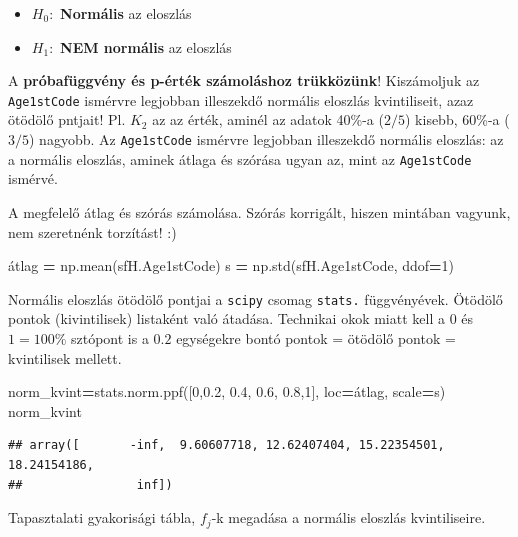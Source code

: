 \documentclass[
]{book}
\newenvironment{Shaded}{\begin{snugshade}}{\end{snugshade}}
\newcommand{\DecValTok}[1]{\textcolor[rgb]{0.00,0.00,0.81}{#1}}
\newcommand{\FloatTok}[1]{\textcolor[rgb]{0.00,0.00,0.81}{#1}}
\newcommand{\NormalTok}[1]{#1}
\newcommand{\OperatorTok}[1]{\textcolor[rgb]{0.81,0.36,0.00}{\textbf{#1}}}
\providecommand{\tightlist}{%
  \setlength{\itemsep}{0pt}\setlength{\parskip}{0pt}}
\begin{document}
\begin{itemize}
\tightlist
\item
  \(H_0:\) \textbf{Normális} az eloszlás
\item
  \(H_1:\) \textbf{NEM normális} az eloszlás
\end{itemize}

A \textbf{próbafüggvény és p-érték számoláshoz trükközünk}! Kiszámoljuk az \texttt{Age1stCode} ismérvre legjobban illeszekdő normális eloszlás kvintiliseit, azaz ötödölő pntjait! Pl. \(K_2\) az az érték, aminél az adatok 40\%-a (\(2/5\)) kisebb, 60\%-a (\(3/5\)) nagyobb.
Az \texttt{Age1stCode} ismérvre legjobban illeszekdő normális eloszlás: az a normális eloszlás, aminek átlaga és szórása ugyan az, mint az \texttt{Age1stCode} ismérvé.

A megfelelő átlag és szórás számolása. Szórás korrigált, hiszen mintában vagyunk, nem szeretnénk torzítást! :)

\begin{Shaded}
\begin{Highlighting}[]
\NormalTok{átlag }\OperatorTok{=}\NormalTok{ np.mean(sfH.Age1stCode)}
\NormalTok{s }\OperatorTok{=}\NormalTok{ np.std(sfH.Age1stCode, ddof}\OperatorTok{=}\DecValTok{1}\NormalTok{)}
\end{Highlighting}
\end{Shaded}

Normális eloszlás ötödölő pontjai a \texttt{scipy} csomag \texttt{stats.} függvényévek. Ötödölő pontok (kivintilisek) listaként való átadása. Technikai okok miatt kell a \(0\) és \(1=100\%\) sztópont is a \(0.2\) egységekre bontó pontok = ötödölő pontok = kvintilisek mellett.

\begin{Shaded}
\begin{Highlighting}[]
\NormalTok{norm\_kvint}\OperatorTok{=}\NormalTok{stats.norm.ppf([}\DecValTok{0}\NormalTok{,}\FloatTok{0.2}\NormalTok{, }\FloatTok{0.4}\NormalTok{, }\FloatTok{0.6}\NormalTok{, }\FloatTok{0.8}\NormalTok{,}\DecValTok{1}\NormalTok{], loc}\OperatorTok{=}\NormalTok{átlag, scale}\OperatorTok{=}\NormalTok{s)}
\NormalTok{norm\_kvint}
\end{Highlighting}
\end{Shaded}

\begin{verbatim}
## array([       -inf,  9.60607718, 12.62407404, 15.22354501, 18.24154186,
##                inf])
\end{verbatim}

Tapasztalati gyakorisági tábla, \(f_j\)-k megadása a normális eloszlás kvintiliseire.
\end{document}
